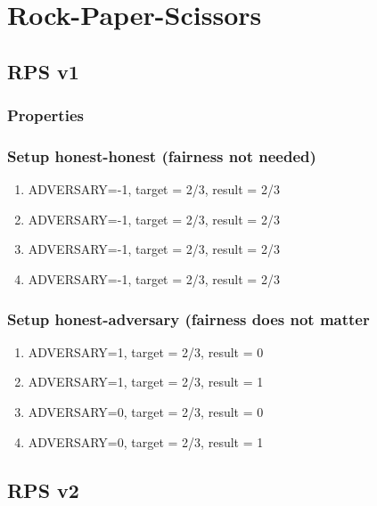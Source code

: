 \documentclass{article}
\begin{document}
\javastyle

\tableofcontents


\section{Rock-Paper-Scissors}

\subsection{RPS v1}



\subsubsection{Properties}



\subsubsection{Setup honest-honest (fairness not needed)}

\begin{enumerate}
\item ADVERSARY=-1, target = 2/3, result = 2/3
\item ADVERSARY=-1, target = 2/3, result = 2/3
\item ADVERSARY=-1, target = 2/3, result = 2/3
\item ADVERSARY=-1, target = 2/3, result = 2/3
\end{enumerate}

\subsubsection{Setup honest-adversary (fairness does not matter}

\begin{enumerate}
\item ADVERSARY=1, target = 2/3, result = 0
\item ADVERSARY=1, target = 2/3, result = 1
\item ADVERSARY=0, target = 2/3, result = 0
\item ADVERSARY=0, target = 2/3, result = 1
\end{enumerate}


\subsection{RPS v2}
\end{document}
